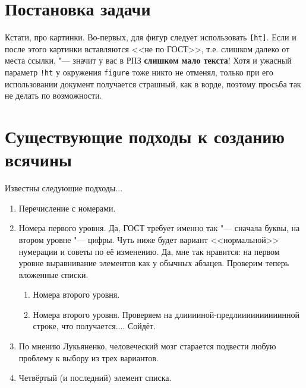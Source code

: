 \section{Постановка задачи}





Кстати, про картинки. Во-первых, для фигур следует использовать \texttt{[ht]}. Если и после этого картинки вставляются <<не по ГОСТ>>, т.е. слишком далеко от места ссылки, "--- значит у вас в РПЗ \textbf{слишком мало текста}! Хотя и ужасный параметр \texttt{!ht} у окружения \texttt{figure} тоже никто не отменял, только при его использовании документ получается страшный, как в ворде, поэтому просьба так не делать по возможности.

\section{Существующие подходы к созданию всячины}

Известны следующие подходы...

\begin{enumerate}
\item Перечисление с номерами.
\item Номера первого уровня. Да, ГОСТ требует именно так "--- сначала буквы, на втором уровне "--- цифры.
Чуть ниже будет вариант <<нормальной>> нумерации и советы по её изменению.
Да, мне так нравится: на первом уровне выравнивание элементов как у обычных абзацев. Проверим теперь вложенные списки.
\begin{enumerate}
\item Номера второго уровня.
\item Номера второго уровня. Проверяем на длииииной-предлиииииииииинной строке, что получается.... Сойдёт.
\end{enumerate}
\item По мнению Лукьяненко, человеческий мозг старается подвести любую проблему к выбору
  из трех вариантов.
\item Четвёртый (и последний) элемент списка.
\end{enumerate}

